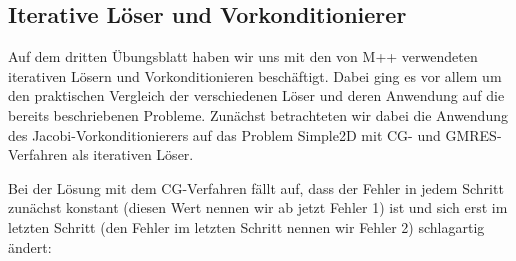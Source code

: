 \documentclass[12pt,a4paper]{scrartcl}
\newcommand{\R}{\mathbb{R}}
\DeclareMathOperator{\dive}{div}
\numberwithin{equation}{section}
\begin{document}
\begin{enumerate}[label=(\roman*)]
\begin{figure}[H]
\end{figure}

%




\end{enumerate}

\subsection{Iterative Löser und Vorkonditionierer}

Auf dem dritten Übungsblatt haben wir uns mit den von M++ verwendeten iterativen Lösern und Vorkonditionieren beschäftigt.
Dabei ging es vor allem um den praktischen Vergleich der verschiedenen Löser und deren Anwendung auf die bereits beschriebenen Probleme.
Zunächst betrachteten wir dabei die Anwendung des Jacobi-Vorkonditionierers auf das Problem Simple2D mit CG- und GMRES-Verfahren als iterativen Löser.

Bei der Lösung mit dem CG-Verfahren fällt auf, dass der Fehler in jedem Schritt zunächst konstant (diesen Wert nennen wir ab jetzt Fehler 1) ist und sich erst im letzten Schritt (den Fehler im letzten Schritt nennen wir Fehler 2) schlagartig ändert:
\end{document}
